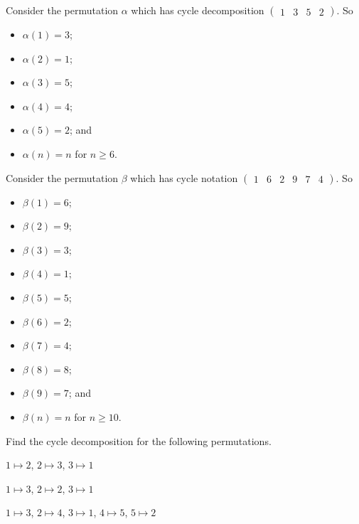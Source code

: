 \begin{example}
    Consider the permutation $\alpha$ which has cycle decomposition $\begin{pmatrix}1 & 3 & 5 & 2\end{pmatrix}$. So
    \begin{multicols}{2}
        \begin{itemize}
            \item $\alpha(1) = 3$;
            \item $\alpha(2) = 1$;
            \item $\alpha(3) = 5$;
            \item $\alpha(4) = 4$;
            \item $\alpha(5) = 2$; and
            \item $\alpha(n) = n$ for $n \geq 6$.
        \end{itemize}
    \end{multicols}
\end{example}

\newpage

\begin{example}
    Consider the permutation $\beta$ which has cycle notation $\begin{pmatrix}1 & 6 & 2 & 9 & 7 & 4\end{pmatrix}$. So
    \begin{multicols}{2}
        \begin{itemize}
            \item $\beta(1) = 6$;
            \item $\beta(2) = 9$;
            \item $\beta(3) = 3$;
            \item $\beta(4) = 1$;
            \item $\beta(5) = 5$;
            \item $\beta(6) = 2$;
            \item $\beta(7) = 4$;
            \item $\beta(8) = 8$;
            \item $\beta(9) = 7$; and
            \item $\beta(n) = n$ for $n \geq 10$.
        \end{itemize}
    \end{multicols}
\end{example}

\begin{exercise}
    Find the cycle decomposition for the following permutations.
    \begin{partquestions}{\alph*}
        \item $1 \mapsto 2$, $2 \mapsto 3$, $3 \mapsto 1$
        \item $1 \mapsto 3$, $2 \mapsto 2$, $3 \mapsto 1$
        \item $1 \mapsto 3$, $2 \mapsto 4$, $3 \mapsto 1$, $4 \mapsto 5$, $5 \mapsto 2$
    \end{partquestions}
\end{exercise}

